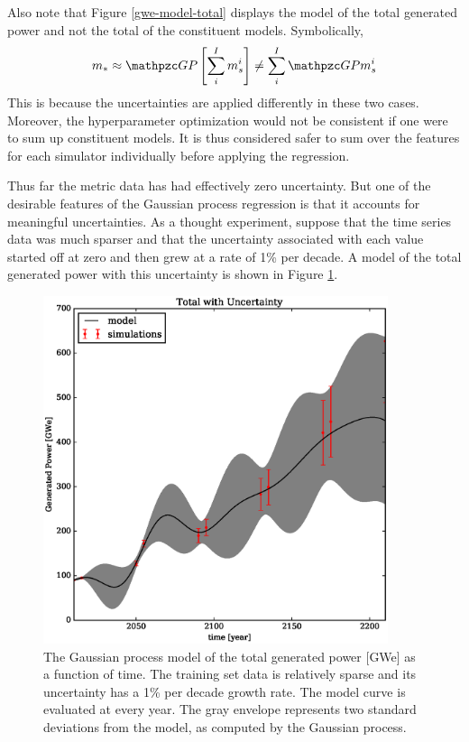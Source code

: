 \clearpage

Also note that Figure \ref{gwe-model-total} displays the model of the total 
generated power and not the total of the constituent models. Symbolically, 
\begin{equation}
\label{total-model}
m_* \approx \GP \left[\sum_i^I m_s^i\right] \ne \sum_i^I \GP m_s^i
\end{equation}
This is because the uncertainties are applied differently in these two cases. 
Moreover, the hyperparameter
optimization would not be consistent if one were to sum up constituent 
models. It is thus considered safer
to sum over the features for each simulator individually before applying the 
regression.

Thus far the metric data has had effectively zero uncertainty.  But one of the 
desirable features of the Gaussian process regression is that it accounts for 
meaningful uncertainties. As a thought experiment, suppose that the time 
series data was much sparser and that 
the uncertainty associated with each value started off at zero and then grew at 
a rate of 1\% per decade. A model of the total generated power with this uncertainty 
is shown in Figure \ref{gwe-model-total-with-uncertainty}.

\begin{figure}[htb]
\centering
\includegraphics[width=0.9\textwidth]{gwe-model-total-with-uncertainty.eps}
\caption{The Gaussian process model of the total generated power [GWe] 
as a function of time. The training set data is relatively sparse and its uncertainty
has a 1\% per decade growth rate. The model curve is evaluated at every year. The 
gray envelope represents two standard deviations from the model, as computed by 
the Gaussian process.}
\label{gwe-model-total-with-uncertainty}
\end{figure}

